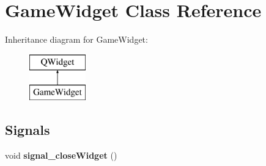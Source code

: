 \hypertarget{class_game_widget}{}\section{Game\+Widget Class Reference}
\label{class_game_widget}
Inheritance diagram for Game\+Widget\+:\begin{figure}[H]
\begin{center}
\leavevmode
\includegraphics[height=2.000000cm]{class_game_widget}
\end{center}
\end{figure}
\subsection*{Signals}
\begin{DoxyCompactItemize}
\item 
\hypertarget{class_game_widget_a27d8b0a3b0fd7dc5a6fd4b3ddefa2a23}{}void {\bfseries signal\+\_\+close\+Widget} ()\label{class_game_widget_a27d8b0a3b0fd7dc5a6fd4b3ddefa2a23}

\end{DoxyCompactItemize}
